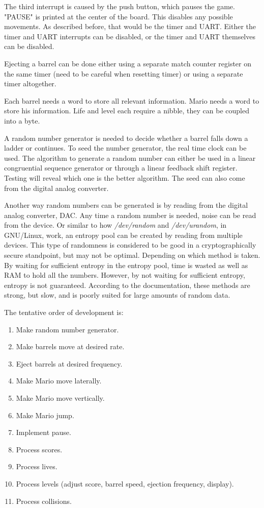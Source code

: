\documentclass[letterpaper,10pt]{article}
\begin{document}
    The third interrupt is caused by the push button, which pauses the game.
    "PAUSE" is printed at the center of the board. This disables any possible
    movements. As described before, that would be the timer and UART. Either
    the timer and UART interrupts can be disabled, or the timer and UART themselves
    can be disabled.

    Ejecting a barrel can be done either using a separate match counter register
    on the same timer (need to be careful when resetting timer) or using a separate
    timer altogether.

    Each barrel needs a word to store all relevant information. Mario needs a
    word to store his information. Life and level each require a nibble, they
    can be coupled into a byte.

    A random number generator is needed to decide whether a barrel falls down a
    ladder or continues. To seed the number generator, the real time clock can
    be used. The algorithm to generate a random number can either be used in a
    linear congruential sequence generator or through a linear feedback shift
    register. Testing will reveal which one is the better algorithm. The seed
    can also come from the digital analog converter.

    Another way random numbers can be generated is by reading from the digital
    analog converter, DAC. Any time a random number is needed, noise can be
    read from the device. Or similar to how \textit{/dev/random} and
    \textit{/dev/urandom}, in GNU/Linux, work, an entropy pool can be created
    by reading from multiple devices. This type of randomness is considered to
    be good in a cryptographically secure standpoint, but may not be optimal.
    Depending on which method is taken. By waiting for sufficient entropy in
    the entropy pool, time is wasted as well as RAM to hold all the numbers.
    However, by not waiting for sufficient entropy, entropy is not guaranteed.
    According to the documentation, these methods are strong, but slow, and
    is poorly suited for large amounts of random data.

    The tentative order of development is:

    \begin{enumerate}
        \item Make random number generator.
        \item Make barrels move at desired rate.
        \item Eject barrels at desired frequency.
        \item Make Mario move laterally.
        \item Make Mario move vertically.
        \item Make Mario jump.
        \item Implement pause.
        \item Process scores.
        \item Process lives.
        \item Process levels (adjust score, barrel speed, ejection frequency, display).
        \item Process collisions.
    \end{enumerate}
\end{document}
